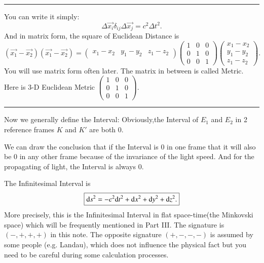 \documentclass[openany,10pt]{book}
\theoremstyle{definition}
\theoremstyle{definition}
\theoremstyle{remark}
\begin{document}
\noindent\rule{\textwidth}{0.3mm}
\rem You can write it simply:
\begin{equation}
\Delta \vec{x_i} \delta_{ij} \Delta \vec{x_j}=c^2\Delta t^2.
\end{equation}
And in  matrix form, the square of Euclidean Distance is
\begin{equation}
  (\vec{x_1}-\vec{x_2})(\vec{x_1}-\vec{x_2})=
    \begin{pmatrix}
   x_1-x_2 & y_1-y_2 & z_1-z_2
  \end{pmatrix}
  \begin{pmatrix}
   1 & 0 & 0 \\
   0 & 1 & 0 \\
   0 & 0 & 1
  \end{pmatrix}
  \begin{pmatrix}
   x_1-x_2 \\
   y_1-y_2 \\
   z_1-z_2
  \end{pmatrix}.
\end{equation}
You will use matrix form often later. The matrix in between is called Metric. Here is 3-D Euclidean Metric $  \begin{pmatrix}
   1 & 0 & 0 \\
   0 & 1 & 0 \\
   0 & 0 & 1
  \end{pmatrix} $.

\noindent\rule{\textwidth}{0.3mm}

Now we generally define the Interval:
Obviously,the Interval of $E_1$ and $E_2$ in 2 reference frames $K$ and $K'$ are both $0$. 

We can draw the conclusion that if the Interval is $0$ in one frame that it will also be $0$ in any other frame because of the invariance of the light speed. And for the propagating of light, the Interval is always $0$.

The Infinitesimal Interval is
\begin{equation}\boxed{
{\rm d} s^2=-c^2{\rm d} t^2+{\rm d} x^2+{\rm d} y^2+{\rm d} z^2.}
\end{equation}
More precisely, this is the Infinitesimal Interval in flat space-time(the Minkovski space) which will be frequently mentioned in Part III. The signature is $(-,+,+,+)$ in this note. The opposite signature $(+,-,-,-)$ is assumed by some people (e.g. Landau), which does not influence the physical fact but you need to be careful during some calculation processes.
\end{document}
